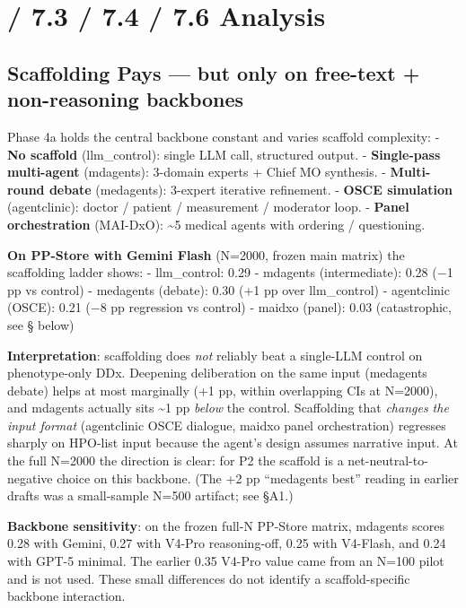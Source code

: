 \section{/ 7.3 / 7.4 / 7.6 Analysis}\label{sec-7-2}

\subsection{Scaffolding Pays --- but only on free-text + non-reasoning backbones}\label{scaffolding-pays-but-only-on-free-text-non-reasoning-backbones}

Phase 4a holds the central backbone constant and varies scaffold complexity:
- \textbf{No scaffold} (llm\_control): single LLM call, structured output.
- \textbf{Single-pass multi-agent} (mdagents): 3-domain experts + Chief MO synthesis.
- \textbf{Multi-round debate} (medagents): 3-expert iterative refinement.
- \textbf{OSCE simulation} (agentclinic): doctor / patient / measurement / moderator loop.
- \textbf{Panel orchestration} (MAI-DxO): \textasciitilde5 medical agents with ordering / questioning.

\textbf{On PP-Store with Gemini Flash} (N=2000, frozen main matrix) the scaffolding ladder shows:
- llm\_control: 0.29
- mdagents (intermediate): 0.28 (\ensuremath{-}1 pp vs control)
- medagents (debate): 0.30 (+1 pp over llm\_control)
- agentclinic (OSCE): 0.21 (\ensuremath{-}8 pp regression vs control)
- maidxo (panel): 0.03 (catastrophic, see \S{} below)

\textbf{Interpretation}: scaffolding does \emph{not} reliably beat a single-LLM control on
phenotype-only DDx. Deepening deliberation on the same input (medagents debate)
helps at most marginally (+1 pp, within overlapping CIs at N=2000), and mdagents
actually sits \textasciitilde1 pp \emph{below} the control. Scaffolding that \emph{changes the input
format} (agentclinic OSCE dialogue, maidxo panel orchestration) regresses sharply
on HPO-list input because the agent's design assumes narrative input. At the full
N=2000 the direction is clear: for P2 the scaffold is a net-neutral-to-negative
choice on this backbone. (The +2 pp ``medagents best'' reading in earlier drafts was
a small-sample N=500 artifact; see \S{}A1.)

\textbf{Backbone sensitivity}: on the frozen full-N PP-Store matrix, mdagents
scores 0.28 with Gemini, 0.27 with V4-Pro reasoning-off, 0.25 with V4-Flash,
and 0.24 with GPT-5 minimal. The earlier 0.35 V4-Pro value came from an N=100
pilot and is not used. These small differences do not identify a
scaffold-specific backbone interaction.

